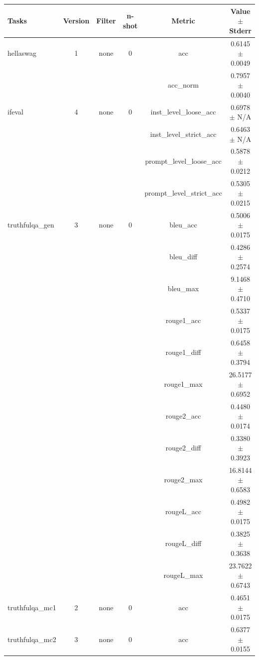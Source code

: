 \documentclass{ifacconf}
\begin{document}
\begin{strip}
\begin{minipage}{\textwidth}
    \begin{table}[H]
    \centering
    \begin{tabular}{|l|c|c|c|c|c|}
    \hline
    \textbf{Tasks} & \textbf{Version} & \textbf{Filter} & \textbf{n-shot} & \textbf{Metric} & \textbf{Value} $\pm$ \textbf{Stderr} \\ \hline
    hellaswag & 1 & none & 0 & acc & 0.6145 $\pm$ 0.0049 \\ \hline
    & & & & acc\_norm & 0.7957 $\pm$ 0.0040 \\ \hline
    ifeval & 4 & none & 0 & inst\_level\_loose\_acc & 0.6978 $\pm$ N/A \\ \hline
    & & & & inst\_level\_strict\_acc & 0.6463 $\pm$ N/A \\ \hline
    & & & & prompt\_level\_loose\_acc & 0.5878 $\pm$ 0.0212 \\ \hline
    & & & & prompt\_level\_strict\_acc & 0.5305 $\pm$ 0.0215 \\ \hline
    truthfulqa\_gen & 3 & none & 0 & bleu\_acc & 0.5006 $\pm$ 0.0175 \\ \hline
    & & & & bleu\_diff & 0.4286 $\pm$ 0.2574 \\ \hline
    & & & & bleu\_max & 9.1468 $\pm$ 0.4710 \\ \hline
    & & & & rouge1\_acc & 0.5337 $\pm$ 0.0175 \\ \hline
    & & & & rouge1\_diff & 0.6458 $\pm$ 0.3794 \\ \hline
    & & & & rouge1\_max & 26.5177 $\pm$ 0.6952 \\ \hline
    & & & & rouge2\_acc & 0.4480 $\pm$ 0.0174 \\ \hline
    & & & & rouge2\_diff & 0.3380 $\pm$ 0.3923 \\ \hline
    & & & & rouge2\_max & 16.8144 $\pm$ 0.6583 \\ \hline
    & & & & rougeL\_acc & 0.4982 $\pm$ 0.0175 \\ \hline
    & & & & rougeL\_diff & 0.3825 $\pm$ 0.3638 \\ \hline
    & & & & rougeL\_max & 23.7622 $\pm$ 0.6743 \\ \hline
    truthfulqa\_mc1 & 2 & none & 0 & acc & 0.4651 $\pm$ 0.0175 \\ \hline
    truthfulqa\_mc2 & 3 & none & 0 & acc & 0.6377 $\pm$ 0.0155 \\ \hline
    \end{tabular}
    \label{tab:qwen25_awq}
    \end{table}
\end{minipage}
\end{strip}
\end{document}
